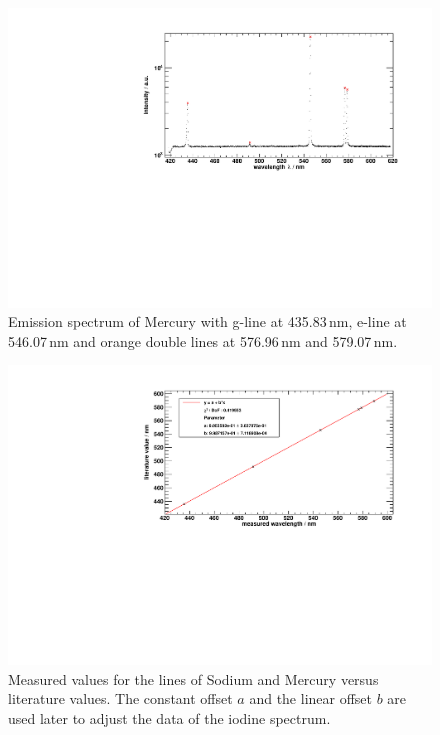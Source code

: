 \begin{figure}[H]
\begin{center}
  \includegraphics[width=\textwidth]{../img/HgPeaks.pdf}
  \caption[---]{Emission spectrum of Mercury with
  g-line at 435.83\,nm,
  e-line at 546.07\,nm and
  orange double lines at 576.96\,nm and 579.07\,nm.}
  \label{img:hg:spectrum}
\end{center}
\end{figure}

\begin{figure}[H]
\begin{center}
  \includegraphics[width=\textwidth]{../img/energy_gauge.pdf}
  \caption[---]{Measured values for the lines of Sodium and Mercury versus literature values.
  The constant offset $a$ and the linear offset $b$ are used later to adjust the data of the iodine spectrum.}
  \label{img:calibrationsystem}
\end{center}
\end{figure}

